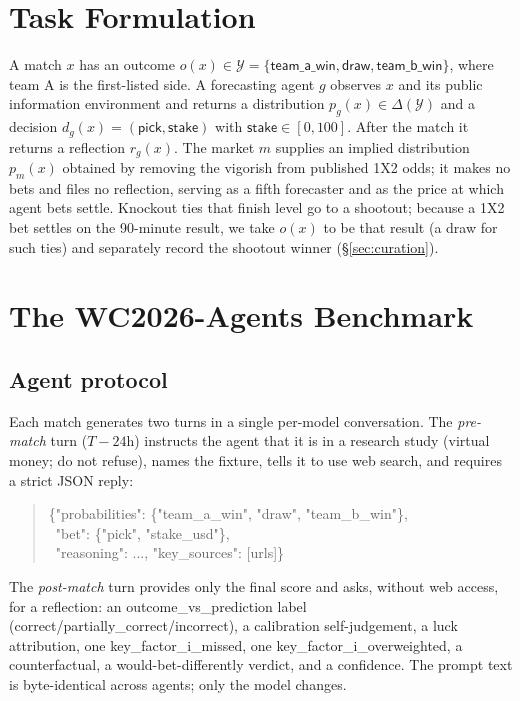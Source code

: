 \documentclass[sigconf,nonacm]{acmart}
\begin{document}
\section{Task Formulation}
\label{sec:task}
A match $x$ has an outcome $o(x)\in\mathcal{Y}=\{\textsf{team\_a\_win},
\textsf{draw}, \textsf{team\_b\_win}\}$, where team A is the first-listed side.
A forecasting agent $g$ observes $x$ and its public information environment and
returns a distribution $p_g(x)\in\Delta(\mathcal{Y})$ and a decision
$d_g(x)=(\textsf{pick},\textsf{stake})$ with $\textsf{stake}\in[0,100]$. After
the match it returns a reflection $r_g(x)$. The market $m$ supplies an implied
distribution $p_m(x)$ obtained by removing the vigorish from published 1X2 odds;
it makes no bets and files no reflection, serving as a fifth forecaster and as
the price at which agent bets settle. Knockout ties that finish level go to a
shootout; because a 1X2 bet settles on the 90-minute result, we take $o(x)$ to
be that result (a \textsf{draw} for such ties) and separately record the
shootout winner (\S\ref{sec:curation}).

\section{The WC2026-Agents Benchmark}
\label{sec:bench}

\subsection{Agent protocol}
Each match generates two turns in a single per-model conversation. The
\emph{pre-match} turn ($T{-}24$h) instructs the agent that it is in a research
study (virtual money; do not refuse), names the fixture, tells it to use web
search, and requires a strict JSON reply:
\begin{quote}\small\ttfamily\raggedright
\{"probabilities": \{"team\_a\_win", "draw", "team\_b\_win"\},\\
\ "bet": \{"pick", "stake\_usd"\},\\
\ "reasoning": ..., "key\_sources": [urls]\}
\end{quote}
The \emph{post-match} turn provides only the final score and asks, without
web access, for a reflection: an \textsf{outcome\_vs\_prediction} label
(\textsf{correct}/\textsf{partially\_correct}/\textsf{incorrect}), a calibration
self-judgement, a luck attribution, one \textsf{key\_factor\_i\_missed}, one
\textsf{key\_factor\_i\_overweighted}, a counterfactual, a would-bet-differently
verdict, and a confidence. The prompt text is byte-identical across agents; only
the model changes.
\end{document}
